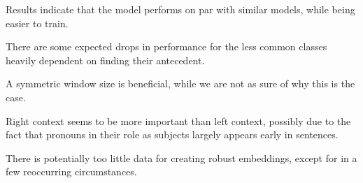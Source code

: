 \documentclass[dvipsnames,a0paper,portrait]{baposter}
\begin{document}
\begin{poster}
\begin{posterbox}[name=anaphora,column=1,below=cohesion]
\begin{center}
\end{center}

\begin{compactitem}
\item Results indicate that the model performs on par with similar models, while being easier to train.
\item There are some expected drops in performance for the less common classes heavily dependent on finding their antecedent.
\item A symmetric window size is beneficial, while we are not as sure of why this is the case.
\item Right context seems to be more important than left context, possibly due to the fact that pronouns in their role as subjects largely appears early in sentences.
\item There is potentially too little data for creating robust embeddings, except for in a few reoccurring circumstances.
\end{compactitem}


\end{posterbox}


\end{poster}%
\end{document}
